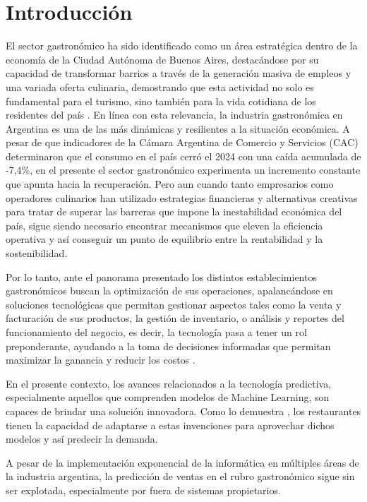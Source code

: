 \chapter{Introducción}

El sector gastronómico ha sido identificado como un área estratégica dentro de la economía de la Ciudad Autónoma de Buenos Aires, destacándose por su capacidad de transformar barrios a través de la generación masiva de empleos y una variada oferta culinaria, demostrando que esta actividad no solo es fundamental para el turismo, sino también para la vida cotidiana de los residentes del país \parencite{srsur2024gastronomico}. En línea con esta relevancia, la industria gastronómica en Argentina es una de las más dinámicas y resilientes a la situación económica. A pesar de que indicadores de la Cámara Argentina de Comercio y Servicios (CAC) \parencite{cac2024consumo} determinaron que el consumo en el país cerró el 2024 con una caída acumulada de -7,4\%, en el presente el sector gastronómico experimenta un incremento constante que apunta hacia la recuperación. Pero aun cuando tanto empresarios como operadores culinarios han utilizado estrategias financieras y alternativas creativas para tratar de superar las barreras que impone la inestabilidad económica del país, sigue siendo necesario encontrar mecanismos que eleven la eficiencia operativa y así conseguir un punto de equilibrio entre la rentabilidad y la sostenibilidad.

Por lo tanto, ante el panorama presentado los distintos establecimientos gastronómicos buscan la optimización de sus operaciones, apalancándose en soluciones tecnológicas que permitan gestionar aspectos tales como la venta y facturación de sus productos, la gestión de inventario, o análisis y reportes del funcionamiento del negocio, es decir, la tecnología pasa a tener un rol preponderante, ayudando a la toma de decisiones informadas que permitan maximizar la ganancia y reducir los costos \parencite{agrawal2023predictive}.

En el presente contexto, los avances relacionados a la tecnología predictiva, especialmente aquellos que comprenden modelos de Machine Learning, son capaces de brindar una solución innovadora. Como lo demuestra \parencite{schmidt2022mlsales}, los restaurantes tienen la capacidad de adaptarse a estas invenciones para aprovechar dichos modelos y así predecir la demanda.

A pesar de la implementación exponencial de la informática en múltiples áreas de la industria argentina, la predicción de ventas en el rubro gastronómico sigue sin ser explotada, especialmente por fuera de sistemas propietarios.

